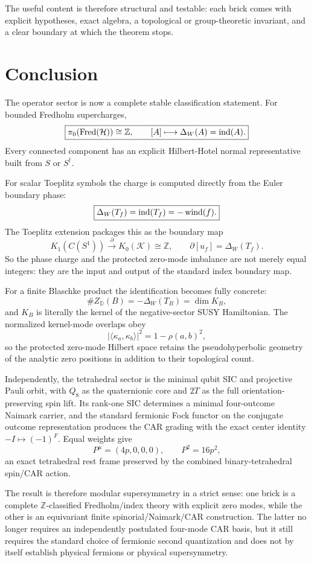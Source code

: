 The useful content is therefore structural and testable: each brick comes with explicit hypotheses, exact algebra, a topological or group-theoretic invariant, and a clear boundary at which the theorem stops.

\section{Conclusion}

The operator sector is now a complete stable classification statement. For bounded Fredholm supercharges,
\[
\boxed{
\pi_0(\operatorname{Fred}(\mathcal H))
\cong
\mathbb Z,
\qquad
[A]\longmapsto\Delta_W(A)=\operatorname{ind}(A).
}
\]
Every connected component has an explicit Hilbert-Hotel normal representative built from $S$ or $S^\dagger$.

For scalar Toeplitz symbols the charge is computed directly from the Euler boundary phase:
\[
\boxed{
\Delta_W(T_f)
=
\operatorname{ind}(T_f)
=
-\operatorname{wind}(f).
}
\]
The Toeplitz extension packages this as the boundary map
\[
\boxed{
K_1(C(S^1))
\xrightarrow{\ \partial\ }
K_0(\mathcal K)
\cong\mathbb Z,
\qquad
\partial[u_f]=\Delta_W(T_f).
}
\]
So the phase charge and the protected zero-mode imbalance are not merely equal integers: they are the input and output of the standard index boundary map.

For a finite Blaschke product the identification becomes fully concrete:
\[
\boxed{
\#Z_{\mathbb D}(B)
=
-\Delta_W(T_B)
=
\dim K_B,
}
\]
and $K_B$ is literally the kernel of the negative-sector SUSY Hamiltonian. The normalized kernel-mode overlaps obey
\[
|\langle\kappa_a,\kappa_b\rangle|^2
=
1-\rho(a,b)^2,
\]
so the protected zero-mode Hilbert space retains the pseudohyperbolic geometry of the analytic zero positions in addition to their topological count.

Independently, the tetrahedral sector is the minimal qubit SIC and projective Pauli orbit, with $Q_8$ as the quaternionic core and $2T$ as the full orientation-preserving spin lift. Its rank-one SIC determines a minimal four-outcome Naimark carrier, and the standard fermionic Fock functor on the conjugate outcome representation produces the CAR grading with the exact center identity $-I\mapsto(-1)^F$. Equal weights give
\[
P^\mu=(4p,0,0,0),
\qquad
P^2=16p^2,
\]
an exact tetrahedral rest frame preserved by the combined binary-tetrahedral spin/CAR action.

The result is therefore modular supersymmetry in a strict sense: one brick is a complete $\mathbb Z$-classified Fredholm/index theory with explicit zero modes, while the other is an equivariant finite spinorial/Naimark/CAR construction. The latter no longer requires an independently postulated four-mode CAR basis, but it still requires the standard choice of fermionic second quantization and does not by itself establish physical fermions or physical supersymmetry.
